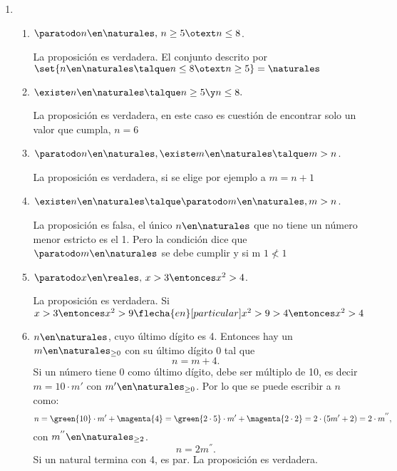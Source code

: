 \begin{enumerate}[label=\roman*)]
  \item

        \begin{enumerate}[label=\alph*)]
          \item $\paratodo n \en \naturales,\, n \geq 5 \otext n \leq 8$.

                La proposición es verdadera. El conjunto descrito por $\set{ n \en \naturales \talque n \leq 8 \otext n \geq 5} = \naturales$
                \doceiA                        \par

          \item $\existe n \en \naturales \talque n \geq 5 \y n\leq 8.$\par
                La proposición es verdadera, en este caso es cuestión de encontrar solo un valor que cumpla, $n = 6$

          \item $\paratodo n \en \naturales, \existe m \en \naturales \talque m > n$.\par
                La proposición es verdadera, si se elige por ejemplo a $m = n+1$

          \item $\existe n \en \naturales \talque \paratodo m \en \naturales, m >n$.\par
                La proposición es falsa, el único $n \en \naturales$ que no tiene un número menor estricto es el 1. Pero la condición
                dice que $\paratodo m \en \naturales$ se debe cumplir y si m $1 \nless 1$

          \item $\paratodo x \en \reales,\, x > 3 \entonces x^2 > 4$.\par
                La proposición es verdadera. Si $x > 3 \entonces x^2 > 9 \flecha{en}[particular] x^2 > 9 > 4 \entonces x^2 > 4$

          \item $n \en \naturales$, cuyo último dígito es 4. Entonces hay un $m \en \naturales_{\geq 0}$ con su último dígito 0 tal que
                $$
                  n = m + 4.
                $$
                Si un número tiene 0 como último dígito, debe ser múltiplo de 10, es decir
                $m = 10 \cdot m'$ con $m' \en \naturales_{\geq 0} $. Por lo que se puede escribir a $n$ como:
                $$
                  n = \green{10} \cdot m' + \magenta{4} =
                  \green{2 \cdot 5} \cdot m' + \magenta{2 \cdot 2} =
                  2 \cdot (5 m' + 2) =
                  2 \cdot m^{''},
                $$ con $m^{''} \en \naturales_{\geq 2}$.
                $$
                  n = 2m^{''}.
                $$
                Si un natural termina con 4, es par. La proposición es verdadera.


\end{enumerate}
\end{enumerate}
